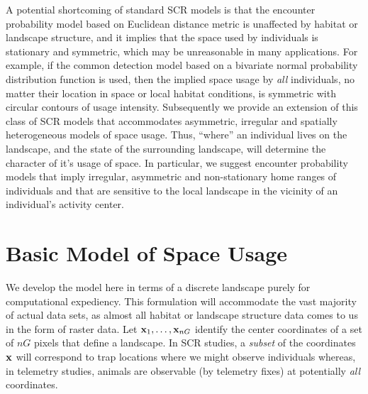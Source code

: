 \documentclass[12pt]{article}
\begin{document}
A
potential shortcoming of
standard SCR models is that the encounter
probability model based on Euclidean distance metric is unaffected by
habitat or landscape structure, and it implies that the space used by
individuals is stationary and symmetric, which may be unreasonable in
many applications.  For example, if the common detection model based
on a bivariate normal probability distribution function is used, then
the implied space usage by {\it all} individuals, no matter their
location in space or local habitat conditions, is symmetric with
circular contours of usage intensity.  Subsequently we provide an
extension of this class of SCR models that accommodates asymmetric,
irregular and spatially heterogeneous models of space usage.  Thus,
``where'' an individual lives on the landscape, and the state of the
surrounding landscape, will determine the character of it's usage of
space. In particular, we suggest encounter probability models that
imply irregular, asymmetric and non-stationary home ranges of
individuals and that are sensitive to the local landscape in the
vicinity of an individual's activity center.

\section{Basic Model of Space Usage}
\label{rsf.sec.rsfmodel}

We develop the model here in terms of a discrete landscape purely for
computational expediency. This formulation will accommodate the vast
majority of actual data sets, as almost all habitat or landscape
structure data comes to us in the form of raster data.  Let ${\bf
  x}_{1},\ldots,{\bf x}_{nG}$ identify the center coordinates of a set
of $nG$ pixels that define a landscape.  In SCR studies, a {\it
  subset} of the coordinates ${\bf x}$ will correspond to trap
locations where we might observe individuals whereas, in telemetry
studies, animals are observable (by telemetry fixes) at potentially
{\it all} coordinates.
\end{document}
